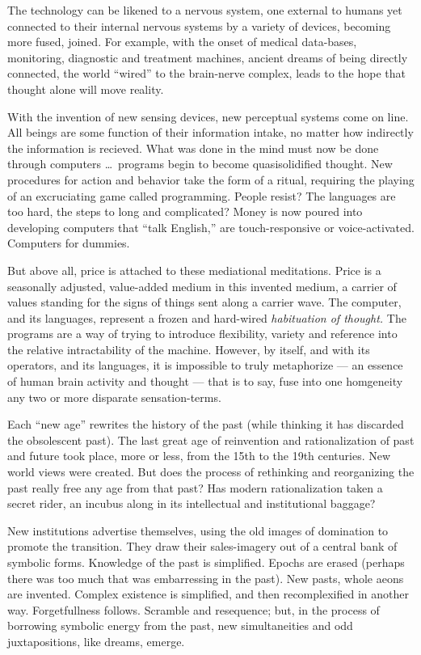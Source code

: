 \documentclass[11pt,twoside,draft]{memoir}
\begin{document}
The technology can be likened to a nervous system, one external to humans yet connected to their internal nervous systems by a variety of devices, becoming more fused, joined. For example, with the onset of medical data-bases, monitoring, diagnostic and treatment machines, ancient dreams of being directly connected, the world \enquote{wired} to the brain-nerve complex, leads to the hope that thought alone will move reality.

With the invention of new sensing devices, new perceptual systems come on line. All beings are some function of their information intake, no matter how indirectly the information is recieved. What was done in the mind must now be done through computers \ldots\ programs begin to become quasisolidified thought. New procedures for action and behavior take the form of a ritual, requiring the playing of an excruciating game called programming. People resist? The languages are too hard, the steps to long and complicated? Money is now poured into developing computers that \enquote{talk English,} are touch-responsive or voice-activated. Computers for dummies.

But above all, price is attached to these mediational meditations. Price is a seasonally adjusted, value-added medium in this invented medium, a carrier of values standing for the signs of things sent along a carrier wave. The computer, and its languages, represent a frozen and hard-wired \emph{habituation of thought.} The programs are a way of trying to introduce flexibility, variety and reference into the relative intractability of the machine. However, by itself, and with its operators, and its languages, it is impossible to truly metaphorize --- an essence of human brain activity and thought --- that is to say, fuse into one homgeneity any two or more disparate sensation-terms.

Each \enquote{new age} rewrites the history of the past (while thinking it has discarded the obsolescent past). The last great age of reinvention and rationalization of past and future took place, more or less, from the 15th to the 19th centuries. New world views were created. But does the process of rethinking and reorganizing the past really free any age from that past? Has modern rationalization taken a secret rider, an incubus along in its intellectual and institutional baggage?

New institutions advertise themselves, using the old images of domination to promote the transition. They draw their sales-imagery out of a central bank of symbolic forms. Knowledge of the past is simplified. Epochs are erased (perhaps there was too much that was embarressing in the past). New pasts, whole aeons are invented. Complex existence is simplified, and then recomplexified in another way. Forgetfullness follows. Scramble and resequence; but, in the process of borrowing symbolic energy from the past, new simultaneities and odd juxtapositions, like dreams, emerge.
\end{document}
